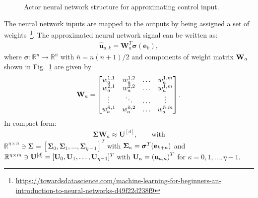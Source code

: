 \documentclass[journal,twoside,web]{ieeecolor}
\begin{document}
\begin{figure}
  \caption{Actor neural network structure for approximating control input.}
  \label{fig:nnActor}
\end{figure}

 
The neural network inputs are mapped to the outputs by being assigned a set of weights~\footnote{\url{https://towardsdatascience.com/machine-learning-for-beginners-an-introduction-to-neural-networks-d49f22d238f9}}. 
The approximated neural network signal can be written as:
\begin{align}
  \label{eq:approximatePolicyActorWeights}
    \hat{\mathbf{u}}_{a,k} = \mathbf{W}_a^T\bm{\sigma}(\mathbf{e}_k),
  \end{align}
%
where $\bm{\sigma}:\mathbb{R}^n\to\mathbb{R}^{\bar{n}}$ with $\bar{n} = n(n+1)/2$ and components of weight matrix ${\bf W}_a$ shown in Fig.~\ref{fig:nnActor} are given by %
%
\begin{align*}
  {\bf W}_a = 
  \begin{bmatrix}
    w_a^{1,1} &  w_a^{1,2} & \ldots &w_a^{1,m}\\
    w_a^{2,1} & w_a^{2,2}& \ldots &w_a^{1,m}\\
    \vdots & \ddots & \ldots &\vdots\\
    w_a^{\bar{n},1} & w_a^{\bar{n},2}& \ldots &w_a^{\bar{n},m}
  \end{bmatrix}.
\end{align*}
%
In compact form:
  \begin{align*}
    \bm{\Sigma}\mathbf{W}_a \approx  \mathbf{U}^{[d]},\qquad\text{with}
  \end{align*}
  $\mathbb{R}^{\eta\times\bar{n}}\ni \bm{\Sigma} = [\bm{\Sigma}_0,\bm{\Sigma}_1,\ldots,\bm{\Sigma}_{\eta -1}]^T$ with $\bm{\Sigma}_\kappa = \bm{\sigma}^T({\bf e}_{k+\kappa})$ and $\mathbb{R}^{\eta\times m}\ni {\bf U}^{[d]} = [{\bf U}_0,{\bf U}_1,\ldots, {\bf U}_{\eta-1}]^T$ with ${\bf U}_\kappa = \left({\bf u}_{a,\kappa}\right)^T$ for $\kappa = 0,1,\ldots,\eta-1.$
\end{document}
